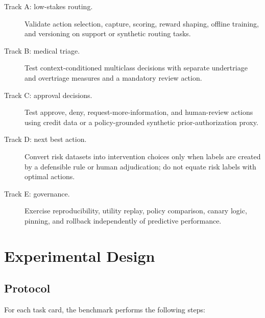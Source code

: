 \documentclass[conference]{IEEEtran}
\begin{document}
\begin{description}
\item[Track A: low-stakes routing.] Validate action selection,
capture, scoring, reward shaping, offline training, and versioning on
support or synthetic routing tasks.
\item[Track B: medical triage.] Test context-conditioned multiclass
decisions with separate undertriage and overtriage measures and a
mandatory review action.
\item[Track C: approval decisions.] Test approve, deny,
request-more-information, and human-review actions using credit data
or a policy-grounded synthetic prior-authorization proxy.
\item[Track D: next best action.] Convert risk datasets into
intervention choices only when labels are created by a defensible rule
or human adjudication; do not equate risk labels with optimal actions.
\item[Track E: governance.] Exercise reproducibility, utility replay,
policy comparison, canary logic, pinning, and rollback independently
of predictive performance.
\end{description}

\section{Experimental Design}
\label{sec:experiment}

\subsection{Protocol}

For each task card, the benchmark performs the following steps:
\end{document}
